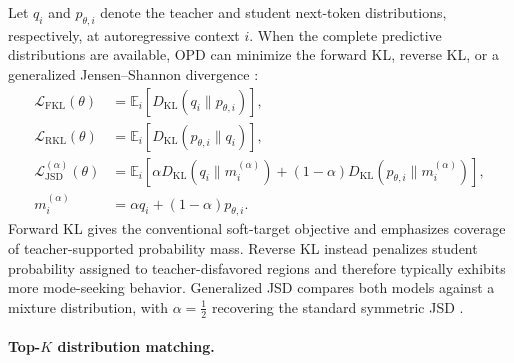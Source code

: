 Let \(q_i\) and \(p_{\theta,i}\) denote the teacher and student next-token
distributions, respectively, at autoregressive context \(i\). When the complete
predictive distributions are available, OPD can minimize the forward KL,
reverse KL, or a generalized Jensen--Shannon divergence
\citep{hinton2015distilling,agarwal2024onpolicy,gu2024minillm}:
\begin{equation*}
\begin{aligned}
 \mathcal L_{\mathrm{FKL}}(\theta)
 &=
 \mathbb E_i\!\left[
 D_{\mathrm{KL}}(q_i\|p_{\theta,i})
 \right],\\
 \mathcal L_{\mathrm{RKL}}(\theta)
 &=
 \mathbb E_i\!\left[
 D_{\mathrm{KL}}(p_{\theta,i}\|q_i)
 \right],\\
 \mathcal L_{\mathrm{JSD}}^{(\alpha)}(\theta)
 &=
 \mathbb E_i\!\left[
 \alpha D_{\mathrm{KL}}(q_i\|m_i^{(\alpha)})
 +(1-\alpha)D_{\mathrm{KL}}(p_{\theta,i}\|m_i^{(\alpha)})
 \right],\\
 m_i^{(\alpha)}
 &=
 \alpha q_i+(1-\alpha)p_{\theta,i}.
\end{aligned}
\end{equation*}
Forward KL gives the conventional soft-target objective and emphasizes
coverage of teacher-supported probability mass. Reverse KL instead penalizes
student probability assigned to teacher-disfavored regions and therefore
typically exhibits more mode-seeking behavior. Generalized JSD compares both
models against a mixture distribution, with \(\alpha=\tfrac12\) recovering
the standard symmetric JSD \citep{kullback1951information,lin1991divergence}.

\paragraph{Top-\(K\) distribution matching.}

